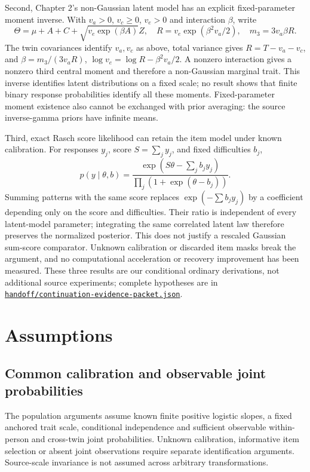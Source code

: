 \documentclass[11pt]{article}
\begin{document}
Second, Chapter 2's non-Gaussian latent model has an explicit fixed-parameter moment inverse. With $v_a>0$, $v_c\geq0$, $v_e>0$ and interaction $\beta$, write
\[
 \Theta=\mu+A+C+\sqrt{v_e\exp(\beta A)}Z,\quad
 R=v_e\exp(\beta^2v_a/2),\quad m_3=3v_a\beta R.
\]
The twin covariances identify $v_a,v_c$ as above, total variance gives $R=T-v_a-v_c$, and $\beta=m_3/(3v_aR)$, $\log v_e=\log R-\beta^2v_a/2$. A nonzero interaction gives a nonzero third central moment and therefore a non-Gaussian marginal trait. This inverse identifies latent distributions on a fixed scale; no result shows that finite binary response probabilities identify all these moments. Fixed-parameter moment existence also cannot be exchanged with prior averaging: the source inverse-gamma priors have infinite means.

Third, exact Rasch score likelihood can retain the item model under known calibration. For responses $y_j$, score $S=\sum_j y_j$, and fixed difficulties $b_j$,
\[
 p(y\mid\theta,b)=\frac{\exp(S\theta-\sum_jb_jy_j)}{\prod_j(1+\exp(\theta-b_j))}.
\]
Summing patterns with the same score replaces $\exp(-\sum b_jy_j)$ by a coefficient depending only on the score and difficulties. Their ratio is independent of every latent-model parameter; integrating the same correlated latent law therefore preserves the normalized posterior. This does not justify a rescaled Gaussian sum-score comparator. Unknown calibration or discarded item masks break the argument, and no computational acceleration or recovery improvement has been measured. These three results are our conditional ordinary derivations, not additional source experiments; complete hypotheses are in \href{https://github.com/alectionary/vibe-math/blob/master/formalization/schwabe-psychometric-genetics/handoff/continuation-evidence-packet.json}{\nolinkurl{handoff/continuation-evidence-packet.json}}.

\section{Assumptions}
\subsection{Common calibration and observable joint probabilities}
The population arguments assume known finite positive logistic slopes, a fixed anchored trait scale, conditional independence and sufficient observable within-person and cross-twin joint probabilities. Unknown calibration, informative item selection or absent joint observations require separate identification arguments. Source-scale invariance is not assumed across arbitrary transformations.
\end{document}
